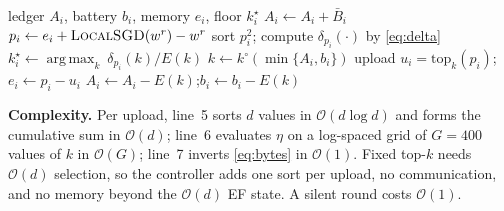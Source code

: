 \documentclass[conference,a4paper]{IEEEtran}
\newcommand{\kst}{k^\star}
\newcommand{\ko}{k^{\circ}}
\newcommand{\Bbar}{\bar{B}}
\DeclareMathOperator*{\argmax}{arg\,max}
\begin{document}
\begin{algorithm}[t]
\caption{EA-MVT, client $i$, round $r$}
\label{alg:mvt}
\begin{algorithmic}[1]
\Require ledger $A_i$, battery $b_i$, memory $e_i$, floor $\kst_i$
\State $A_i\gets A_i+\Bbar_i$
\If{$A_i<E(\kst_i)$} \Return {}
\EndIf
\State $p_i\gets e_i+\textsc{LocalSGD}(w^r)-w^r$
\State sort $p_i^2$; compute $\delta_{p_i}(\cdot)$ by \eqref{eq:delta}
\State $\kst_i\gets\argmax_k\ \delta_{p_i}(k)/E(k)$
\State $k\gets\ko(\min\{A_i,b_i\})$
\State upload $u_i=\mathrm{top}_k(p_i)$;\quad $e_i\gets p_i-u_i$
\State $A_i\gets A_i-E(k)$;\quad $b_i\gets b_i-E(k)$
\end{algorithmic}
\end{algorithm}

\textbf{Complexity.} Per upload, line~5 sorts $d$ values in $\mathcal{O}(d\log d)$ and forms the cumulative sum in $\mathcal{O}(d)$; line~6 evaluates $\eta$ on a log-spaced grid of $G=400$ values of $k$ in $\mathcal{O}(G)$; line~7 inverts \eqref{eq:bytes} in $\mathcal{O}(1)$. Fixed top-$k$ needs $\mathcal{O}(d)$ selection, so the controller adds one sort per upload, no communication, and no memory beyond the $\mathcal{O}(d)$ EF state. A silent round costs $\mathcal{O}(1)$.
\end{document}
